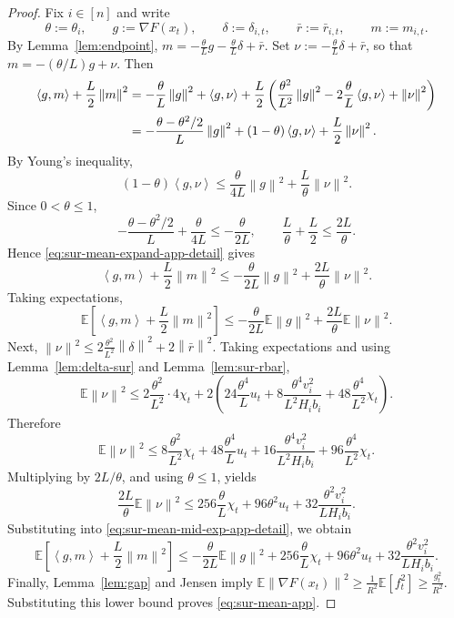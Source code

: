 \documentclass{article}
\theoremstyle{definition}
\newcommand{\EE}{\mathbb E}
\newcommand{\norm}[1]{\left\lVert #1\right\rVert}
\newcommand{\ip}[2]{\left\langle #1,#2\right\rangle}
\begin{document}
\begin{proof}
Fix $i\in[n]$ and write
\[
\theta:=\theta_i,
\qquad
g:=\nabla F(x_t),
\qquad
\delta:=\delta_{i,t},
\qquad
\bar r:=\bar r_{i,t},
\qquad
m:=m_{i,t}.
\]
By Lemma~\ref{lem:endpoint}, $m
=
-\frac{\theta}{L}g
-
\frac{\theta}{L}\delta
+
\bar r$.
Set $
\nu:=-\frac{\theta}{L}\delta+\bar r$,
so that $m=-(\theta/L)g+\nu$. Then
\begin{align}
\ip{g}{m}+\frac{L}{2}\norm{m}^2
&=
-\frac{\theta}{L}\norm{g}^2+\ip{g}{\nu}
+
\frac{L}{2}
\left(
\frac{\theta^2}{L^2}\norm{g}^2
-
2\frac{\theta}{L}\ip{g}{\nu}
+
\norm{\nu}^2
\right)
\notag\\
&=
-\frac{\theta-\theta^2/2}{L}\norm{g}^2
+
(1-\theta)\ip{g}{\nu}
+
\frac{L}{2}\norm{\nu}^2.
\label{eq:sur-mean-expand-app-detail}
\end{align}
By Young's inequality,
\[
(1-\theta)\ip{g}{\nu}
\le
\frac{\theta}{4L}\norm{g}^2+\frac{L}{\theta}\norm{\nu}^2.
\]
Since $0<\theta\le 1$,
\[
-\frac{\theta-\theta^2/2}{L}+\frac{\theta}{4L}
\le
-\frac{\theta}{2L},
\qquad
\frac{L}{\theta}+\frac{L}{2}\le \frac{2L}{\theta}.
\]
Hence \eqref{eq:sur-mean-expand-app-detail} gives
\begin{equation}
\ip{g}{m}+\frac{L}{2}\norm{m}^2
\le
-\frac{\theta}{2L}\norm{g}^2
+
\frac{2L}{\theta}\norm{\nu}^2.
\label{eq:sur-mean-mid-app-detail}\end{equation}
Taking expectations,
\begin{equation}
\EE\!\left[
\ip{g}{m}+\frac{L}{2}\norm{m}^2
\right]
\le
-\frac{\theta}{2L}\EE\norm{g}^2
+
\frac{2L}{\theta}\EE\norm{\nu}^2.
\label{eq:sur-mean-mid-exp-app-detail}\end{equation}
Next, $
\norm{\nu}^2
\le
2\frac{\theta^2}{L^2}\norm{\delta}^2+2\norm{\bar r}^2$.
Taking expectations and using Lemma~\ref{lem:delta-sur} and
Lemma~\ref{lem:sur-rbar},
\[
\EE\norm{\nu}^2
\le
2\frac{\theta^2}{L^2}\cdot 4\chi_t
+
2\left(
24\frac{\theta^4}{L}u_t
+
8\frac{\theta^4v_i^2}{L^2H_i b_i}
+
48\frac{\theta^4}{L^2}\chi_t
\right).
\]
Therefore
\[
\EE\norm{\nu}^2
\le
8\frac{\theta^2}{L^2}\chi_t
+
48\frac{\theta^4}{L}u_t
+
16\frac{\theta^4v_i^2}{L^2H_i b_i}
+
96\frac{\theta^4}{L^2}\chi_t.
\]
Multiplying by $2L/\theta$, and using $\theta\le 1$, yields
\[
\frac{2L}{\theta}\EE\norm{\nu}^2
\le
256\frac{\theta}{L}\chi_t
+
96\theta^2u_t
+
32\frac{\theta^2v_i^2}{L H_i b_i}.
\]
Substituting into \eqref{eq:sur-mean-mid-exp-app-detail}, we obtain
\[
\EE\!\left[
\ip{g}{m}+\frac{L}{2}\norm{m}^2
\right]
\le
-\frac{\theta}{2L}\EE\norm{g}^2
+
256\frac{\theta}{L}\chi_t
+
96\theta^2u_t
+
32\frac{\theta^2v_i^2}{L H_i b_i}.
\]
Finally, Lemma~\ref{lem:gap} and Jensen imply $
\EE\norm{\nabla F(x_t)}^2
\ge
\frac{1}{R^2}\EE[f_t^2]
\ge
\frac{g_t^2}{R^2}$.
Substituting this lower bound proves \eqref{eq:sur-mean-app}.
\end{proof}
\end{document}
